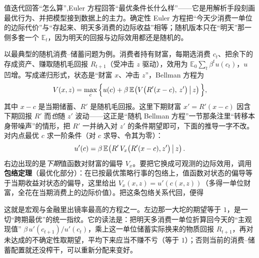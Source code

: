 值迭代回答``怎么算'',Euler 方程回答``最优条件长什么样''——它是用解析手段刻画最优行为、并把模型接到数据上的主力。确定性 Euler 方程把``今天少消费一单位的边际代价''与``存起来、明天多消费的边际收益''相等；随机版本只在``明天''那一侧多套一个 $\mathbb{E}_t$，因为明天的回报与边际效用都还是随机的。

以最典型的随机消费--储蓄问题为例。消费者持有财富，每期选消费 $c_t$、把余下的存成资产、赚取随机毛回报 $R_{t+1}$（受冲击 $z$ 驱动），效用为 $\mathbb{E}_0\sum_t\beta^t u(c_t)$，$u$ 凹增。写成递归形式，状态是``财富 $x$、冲击 $z$''，Bellman 方程为
\[
    V(x,z)=\max_{c}\Big\{u(c)+\beta\,\mathbb{E}_{}\!\left(V\big(R'(x-c),\,z'\big)\,\middle|\, z\right)\Big\},
\]
其中 $x-c$ 是当期储蓄、$R'$ 是随机毛回报。这里下期财富 $x'=R'(x-c)$ 因含下期回报 $R'$ 而\emph{也}随 $z'$ 波动——这正是``随机 Bellman 方程''一节那条注里``转移本身带噪声''的情形，把 $R'$ 一并纳入对 $z'$ 的条件期望即可，下面的推导一字不改。对内点最优 $c$ 求一阶条件（对 $c$ 求导、令其为零）：
\[
    u'(c)=\beta\,\mathbb{E}_{}\!\left(R'\,V_x\big(R'(x-c),z'\big)\,\middle|\, z\right).
\]
右边出现的是\emph{下期}值函数对财富的偏导 $V_x$。要把它换成可观测的边际效用，调用\textbf{包络定理}（最优化部分）：在已按最优策略行事的包络上，值函数对状态的偏导等于当期收益对状态的偏导，这里给出 $V_x(x,z)=u'(c(x,z))$（多得一单位财富，全花在当期消费上的边际价值）。把这条包络关系代回，便得


这就是宏观与金融里出镜率最高的方程之一。左边那一大坨的期望等于 $1$，是一切``跨期最优''的统一指纹。它的读法是：把明天多消费一单位折算回今天的``主观现值'' $\beta\,u'(c_{t+1})/u'(c_t)$，乘上这一单位储蓄实际换来的物质回报 $R_{t+1}$，再对未达成的不确定性取期望，平均下来应当不赚不亏（等于 $1$）；否则当前的消费--储蓄配置就还没榨干，可以重新分配来变好。



